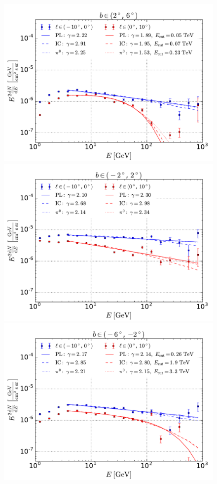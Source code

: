 \begin{figure}[h!]
\centering
\includegraphics[width=\onepic\textwidth]{plots/SED_boxes_source_4cutoff.pdf} \\
\includegraphics[width=\onepic\textwidth]{plots/SED_boxes_source_0cutoff.pdf} \\
\includegraphics[width=\onepic\textwidth]{plots/SED_boxes_source_-4cutoff.pdf}

\end{figure}
